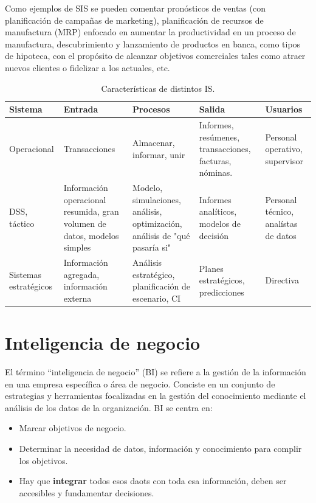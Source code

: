 Como ejemplos de SIS se pueden comentar pronósticos de ventas (con planificación de campañas de marketing), planificación de recursos de manufactura (MRP) enfocado en aumentar la productividad en un proceso de manufactura, descubrimiento y lanzamiento de productos en banca, como tipos de hipoteca, con el propósito de alcanzar objetivos comerciales tales como atraer nuevos clientes o fidelizar a los actuales, etc.

\begin{table}[ht]
\centering
\begin{tabular}{p{2.75cm}p{2.5cm}p{3cm}p{2.5cm}p{2.5cm}}
\hline
\rowcolor{gray!50}
\textbf{Sistema} & \textbf{Entrada} & \textbf{Procesos} & \textbf{Salida} & \textbf{Usuarios} \\ \hline
\footnotesize Operacional & \footnotesize Transacciones & \footnotesize Almacenar, informar, unir & \footnotesize Informes, resúmenes, transacciones, facturas, nóminas. & \footnotesize Personal operativo, supervisor \\ \hline
\footnotesize DSS, táctico & \footnotesize Información operacional resumida, gran volumen de datos, modelos simples & \footnotesize Modelo, simulaciones, análisis, optimización, análisis de "qué pasaría si"  & \footnotesize Informes analíticos, modelos de decisión & \footnotesize Personal técnico, analístas de datos \\ \hline
\footnotesize Sistemas estratégicos & \footnotesize Información agregada, información externa & \footnotesize Análisis estratégico, planificación de escenario, CI & \footnotesize Planes estratégicos, predicciones & \footnotesize Directiva \\ \hline
\end{tabular}
\caption{Características de distintos IS.}
\end{table}

\section{Inteligencia de negocio}

El término ``inteligencia de negocio'' (BI) se refiere a la gestión de la información en una empresa específica o área de negocio. Conciste en un conjunto de estrategias y herramientas focalizadas en la gestión del conocimiento mediante el análisis de los datos de la organización. BI se centra en:
\begin{itemize}
\item Marcar objetivos de negocio.
\item Determinar la necesidad de datos, información y conocimiento para complir los objetivos.
\item Hay que \textbf{integrar} todos esos daots con toda esa información, deben ser accesibles y fundamentar decisiones.
\end{itemize}

